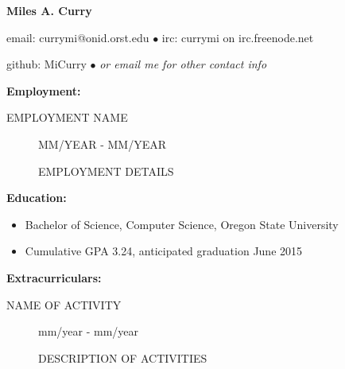 \documentclass[11pt]{article}
\begin{document}
\centerline{{\LARGE \bf Miles A. Curry}}

\bigskip

\centerline{email: currymi@onid.orst.edu
        $\bullet$
        irc: currymi on irc.freenode.net}
\centerline{github: MiCurry
        $\bullet$
        \emph{or email me for other contact info}}

\bigskip
\hrulefill
\bigskip

{\Large \bf Employment:}
\begin{description}
\item[EMPLOYMENT NAME]
    \hfill MM/YEAR - MM/YEAR
       
     EMPLOYMENT DETAILS


\end{description}

\smallskip
\hrulefill
\bigskip

{\Large \bf Education:}
\begin{itemize}
    \setlength{\itemsep}{1pt}
    \setlength{\parskip}{0pt}
    \setlength{\parsep}{0pt}

    \item Bachelor of Science, Computer Science, Oregon State University
    \item Cumulative GPA 3.24, anticipated graduation June 2015

\end{itemize}

\smallskip
\hrulefill
\bigskip

{\Large \bf Extracurriculars:}
\begin{description}
    \item[NAME OF ACTIVITY]
        \hfill mm/year - mm/year
 
        DESCRIPTION OF ACTIVITIES

\end{description}
\end{document}
